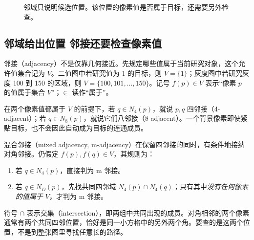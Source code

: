 \begin{figure}[htbp]
\centering
{}
\caption{邻域只说明候选位置。该位置的像素值是否属于目标，还需要另外检查。}
\end{figure}

\subsection{邻域给出位置 邻接还要检查像素值}

邻接（adjacency）不是仅靠几何接近。先规定哪些值属于当前研究对象，这个允许值集合记为 $V$。二值图中若研究值为 1 的目标，则 $V=\{1\}$；灰度图中若研究灰度 100 到 150 的区域，则 $V=\{100,101,\ldots,150\}$。记号 $f(p)\in V$ 表示“像素 $p$ 的值属于集合 $V$”；$\in$ 读作“属于”。

在两个像素值都属于 $V$ 的前提下，若 $q\in N_4(p)$，就说 $p,q$ 四邻接（4-adjacent）；若 $q\in N_8(p)$，就说它们八邻接（8-adjacent）。一个背景像素即使紧贴目标，也不会因此自动成为目标的连通成员。

混合邻接（mixed adjacency, m-adjacency）在保留四邻接的同时，有条件地接纳对角邻接。仍假定 $f(p),f(q)\in V$，其规则为：
\begin{enumerate}[label=\arabic*.]
\item 若 $q\in N_4(p)$，直接判为 m 邻接。
\item 若 $q\in N_D(p)$，先找共同四邻域 $N_4(p)\cap N_4(q)$；只有其中\emph{没有任何像素的值属于 $V$}，才判为 m 邻接。
\end{enumerate}
符号 $\cap$ 表示交集（intersection），即两组中共同出现的成员。对角相邻的两个像素通常有两个共同四邻位置，恰好是同一小方格中的另外两个角。要查的是这两个位置，不是到整张图里寻找任意长的路径。

